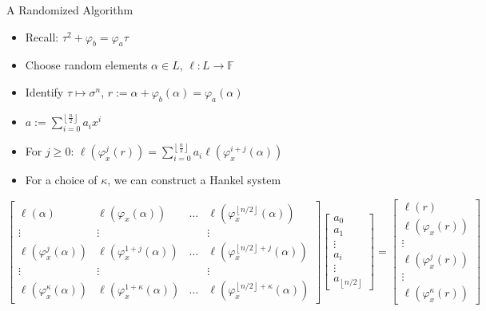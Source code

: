 \documentclass{beamer}
\newcommand{\f}{\mathbb{F}}
\begin{document}




\begin{frame}{A Randomized Algorithm}

\begin{itemize}
    \item Recall: $\tau^2 + \varphi_b = \varphi_a \tau$
    \item Choose random elements $\alpha \in L$, $\ell : L \to \f$
    \item Identify $\tau \mapsto \sigma^n$, $r := \alpha + \varphi_b(\alpha) = \varphi_a(\alpha)$
    \item $a := \sum_{i=0}^{\left\lfloor \frac{n}{2} \right\rfloor}a_ix^i$
    \item For $j \geq 0$: $\ell(\varphi_x^j(r)) = \sum_{i = 0}^{\left\lfloor{\frac{n}{2}} \right\rfloor}a_i\ell(\varphi_x^{i+j}(\alpha))$
    \item For a choice of $\kappa$, we can construct a Hankel system
\end{itemize}
\[ \begin{bmatrix}\ell(\alpha) & \ell(\varphi_x(\alpha)) & \ldots & \ell(\varphi_x^{\left\lfloor n/2 \right\rfloor}(\alpha)) \\ \vdots & \vdots & & \vdots \\ 

\ell(\varphi_x^{j}(\alpha)) & \ell(\varphi_x^{1+j}(\alpha)) & \ldots & \ell(\varphi_x^{\left\lfloor n/2 \right\rfloor+j}(\alpha)) \\ \vdots & \vdots & & \vdots \\

\ell(\varphi_x^{\kappa}(\alpha)) & \ell(\varphi_x^{1 + \kappa }(\alpha)) & \ldots & \ell(\varphi_x^{\left\lfloor n/2 \right\rfloor + \kappa}(\alpha))

\end{bmatrix} \begin{bmatrix} a_0 \\ a_1 \\ \vdots \\ a_i \\ \vdots \\ a_{\left\lfloor n/2 \right\rfloor} \end{bmatrix} = \begin{bmatrix} \ell(r) \\ \ell(\varphi_x(r)) \\ \vdots \\ \ell(\varphi_x^j(r)) \\ \vdots  \\   \ell(\varphi_x^{\kappa}(r)) \end{bmatrix} \]
    
\end{frame}
\end{document}
